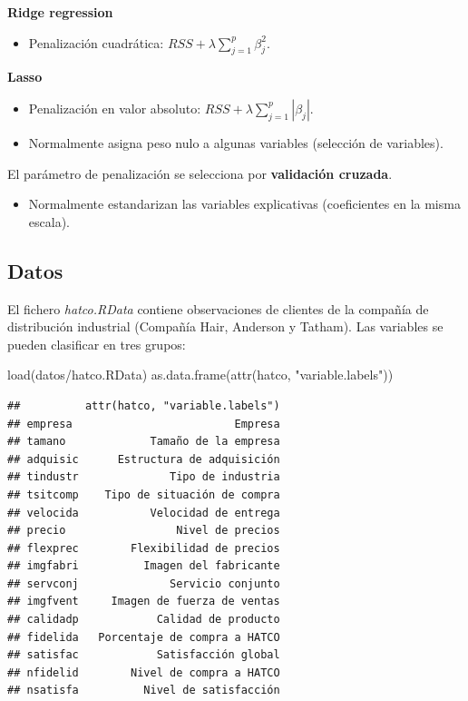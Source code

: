 \documentclass[
]{book}
\newenvironment{Shaded}{\begin{snugshade}}{\end{snugshade}}
\newcommand{\FunctionTok}[1]{\textcolor[rgb]{0.00,0.00,0.00}{#1}}
\newcommand{\NormalTok}[1]{#1}
\newcommand{\StringTok}[1]{\textcolor[rgb]{0.31,0.60,0.02}{#1}}
\providecommand{\tightlist}{%
  \setlength{\itemsep}{0pt}\setlength{\parskip}{0pt}}
\theoremstyle{break}
\begin{document}
\textbf{Ridge regression}

\begin{itemize}
\tightlist
\item
  Penalización cuadrática: \(RSS+\lambda\sum_{j=1}^{p}\beta_{j}^{2}\).
\end{itemize}

\textbf{Lasso}

\begin{itemize}
\item
  Penalización en valor absoluto: \(RSS+\lambda\sum_{j=1}^{p}|\beta_{j}|\).
\item
  Normalmente asigna peso nulo a algunas variables
  (selección de variables).
\end{itemize}

El parámetro de penalización se selecciona por \textbf{validación cruzada}.

\begin{itemize}
\tightlist
\item
  Normalmente estandarizan las variables explicativas
  (coeficientes en la misma escala).
\end{itemize}

\hypertarget{datos}{%
\subsection{Datos}\label{datos}}

El fichero \emph{hatco.RData} contiene observaciones de clientes de la compañía de
distribución industrial (Compañía Hair, Anderson y Tatham).
Las variables se pueden clasificar en tres grupos:

\begin{Shaded}
\begin{Highlighting}[]
\FunctionTok{load}\NormalTok{(}\StringTok{\textquotesingle{}datos/hatco.RData\textquotesingle{}}\NormalTok{)}
\FunctionTok{as.data.frame}\NormalTok{(}\FunctionTok{attr}\NormalTok{(hatco, }\StringTok{"variable.labels"}\NormalTok{))}
\end{Highlighting}
\end{Shaded}

\begin{verbatim}
##          attr(hatco, "variable.labels")
## empresa                         Empresa
## tamano             Tamaño de la empresa
## adquisic      Estructura de adquisición
## tindustr              Tipo de industria
## tsitcomp    Tipo de situación de compra
## velocida           Velocidad de entrega
## precio                 Nivel de precios
## flexprec        Flexibilidad de precios
## imgfabri          Imagen del fabricante
## servconj              Servicio conjunto
## imgfvent     Imagen de fuerza de ventas
## calidadp            Calidad de producto
## fidelida   Porcentaje de compra a HATCO
## satisfac            Satisfacción global
## nfidelid        Nivel de compra a HATCO
## nsatisfa          Nivel de satisfacción
\end{verbatim}
\end{document}
